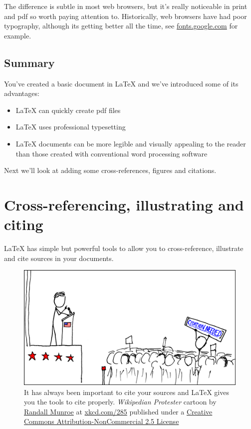 \documentclass[
]{book}
\providecommand{\tightlist}{%
  \setlength{\itemsep}{0pt}\setlength{\parskip}{0pt}}
\begin{document}
The difference is subtle in most web browsers, but it's really noticeable in print and pdf so worth paying attention to. Historically, web browsers have had poor typography, although its getting better all the time, see \href{https://fonts.google.com/}{fonts.google.com} for example.

\hypertarget{concsimple}{%
\section{Summary}\label{concsimple}}

You've created a basic document in LaTeX and we've introduced some of its advantages:

\begin{itemize}
\tightlist
\item
  LaTeX can quickly create pdf files
\item
  LaTeX uses professional typesetting
\item
  LaTeX documents can be more legible and visually appealing to the reader than those created with conventional word processing software
\end{itemize}

Next we'll look at adding some cross-references, figures and citations.

\hypertarget{figref}{%
\chapter{Cross-referencing, illustrating and citing}\label{figref}}

LaTeX has simple but powerful tools to allow you to cross-reference, illustrate and cite sources in your documents.

\begin{figure}

{\centering \includegraphics[width=0.7\linewidth]{images/wikipedian_protester} 

}

\caption{It has always been important to cite your sources and LaTeX gives you the tools to cite properly. \emph{Wikipedian Protester} cartoon by \href{https://en.wikipedia.org/wiki/Randall_Munroe}{Randall Munroe} at \href{https://xkcd.com/285/}{xkcd.com/285} published under a \href{https://creativecommons.org/licenses/by-nc/2.5/}{Creative Commons Attribution-NonCommercial 2.5 License}}\label{fig:wikipedian-fig}
\end{figure}
\end{document}
